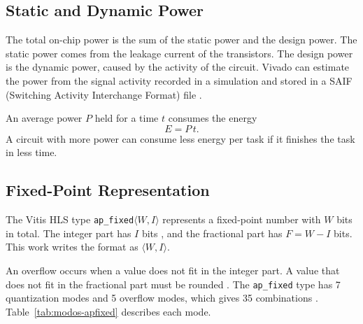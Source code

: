 \subsection{Static and Dynamic Power}\label{subsec:potencia}
The total on-chip power is the sum of the static power and the design power. The static power comes from the leakage current of the transistors. The design power is the dynamic power, caused by the activity of the circuit. Vivado can estimate the power from the signal activity recorded in a simulation and stored in a SAIF (Switching Activity Interchange Format) file \cite{ug907}.

An average power $P$ held for a time $t$ consumes the energy
\begin{equation}\label{eq:energia}
E = P\, t.
\end{equation}
A circuit with more power can consume less energy per task if it finishes the task in less time.

\subsection{Fixed-Point Representation}\label{subsubsec:ponto-fixo}
The Vitis HLS type \texttt{ap\_fixed}$\langle W, I\rangle$ represents a fixed-point number with $W$ bits in total. The integer part has $I$ bits \cite{kastner-hls}, and the fractional part has $F = W - I$ bits. This work writes the format as $\langle W, I\rangle$.

An overflow occurs when a value does not fit in the integer part. A value that does not fit in the fractional part must be rounded \cite{kastner-hls}. The \texttt{ap\_fixed} type has 7 quantization modes and 5 overflow modes, which gives 35 combinations \cite{ug1399}. Table~\ref{tab:modos-apfixed} describes each mode.

